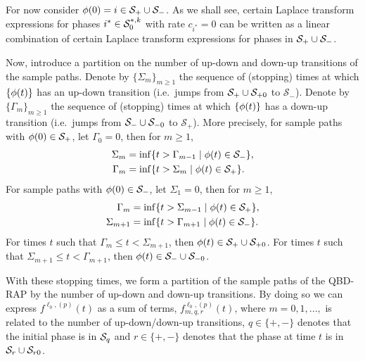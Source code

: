 For now consider \(\phi(0)=i\in\mathcal{S}_+\cup\mathcal{S}_-\). As we shall see, certain Laplace transform expressions for phases \(i^*\in\mathcal{S}_0^{*,k}\) with rate \(c_{i^*}=0\) can be written as a linear combination of certain Laplace transform expressions for phases in \(\mathcal{S}_+\cup\mathcal{S}_-\). 

Now, introduce a partition on the number of up-down and down-up transitions of the sample paths. Denote by \(\{\Sigma_m\}_{m\geq 1}\) the sequence of (stopping) times at which \(\{\phi(t)\}\) has an up-down transition (i.e.~jumps from \(\mathcal S_+\cup\mathcal{S}_{+0}\) to \(\mathcal S_- \)). Denote by \(\{\Gamma_m\}_{m\geq 1}\) the sequence of (stopping) times at which \(\{\phi(t)\}\) has a down-up transition (i.e.~jumps from \(\mathcal S_-\cup\mathcal{S}_{-0}\) to \(\mathcal S_+\)). More precisely, for sample paths with \(\phi(0)\in\mathcal S_+\), let \(\Gamma_0=0\), then for \(m\geq 1\), 
\begin{align}
	\Sigma_m &=\inf\{t > \Gamma_{m-1} \mid \phi(t)\in\mathcal S_-\}, 
	\\ \Gamma_m &=\inf\{t > \Sigma_{m} \mid \phi(t)\in\mathcal S_+\}.
\end{align}
For sample paths with \(\phi(0)\in\mathcal S_-\), let \(\Sigma_1=0\), then for \(m\geq 1\), 
\begin{align}
	\Gamma_m &=\inf\{t > \Sigma_{m-1} \mid \phi(t)\in\mathcal S_+\},
	\\\Sigma_{m+1} &=\inf\{t > \Gamma_{m+1} \mid \phi(t)\in\mathcal S_-\}.
\end{align}
For times \(t\) such that \(\Gamma_m\leq t<\Sigma_{m+1}\), then \(\phi(t)\in\mathcal S_+\cup\mathcal{S}_{+0}\). For times \(t\) such that \(\Sigma_{m+1}\leq t< \Gamma_{m+1}\), then \(\phi(t)\in\mathcal S_-\cup\mathcal{S}_{-0}\).


With these stopping times, we form a partition of the sample paths of the QBD-RAP by the number of up-down and down-up transitions. By doing so we can express \(f^{\ell_0,(p)}(t)\) as a sum of terms, \(f^{\ell_0,(p)}_{m,q,r}(t)\), where \(m=0,1,...,\) is related to the number of up-down/down-up transitions, \(q\in\{+,-\}\) denotes that the initial phase is in \(\mathcal{S}_q\) and \(r\in\{+,-\}\) denotes that the phase at time \(t\) is in \(\mathcal{S}_r\cup\mathcal{S}_{r0}\). 

